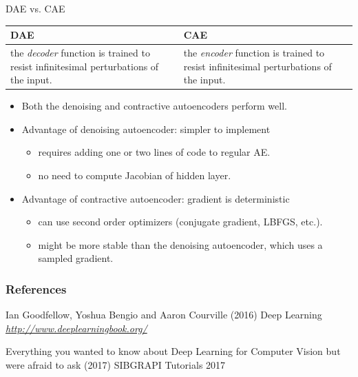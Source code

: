 \begin{frame}[t]{DAE vs. CAE}
    \begin{table}[h!]
        \centering
        \label{tab:}
        \begin{tabular}{p{5cm}|p{5cm}}
            \textbf{DAE} & \textbf{CAE}\\
            \hline
            the \textit{decoder} function is trained to resist infinitesimal perturbations of the input. & the \textit{encoder} function is trained to resist infinitesimal perturbations of the input.
        \end{tabular}
    \end{table}

\begin{itemize}
\item Both the denoising and contractive autoencoders perform well.
\item Advantage of denoising autoencoder: simpler to implement
\begin{itemize}
\item  requires adding one or two lines of code to regular AE.
\item  no need to compute Jacobian of hidden layer.
\end{itemize}
\item Advantage of contractive autoencoder: gradient is deterministic
\begin{itemize}
\item can use second order optimizers (conjugate gradient, LBFGS, etc.).
\item might be more stable than the denoising autoencoder, which uses a sampled gradient.
\end{itemize}

\end{itemize}

\end{frame}

\begin{vbframe}
\frametitle{References}
\footnotesize{
\begin{thebibliography}{99}
 Ian Goodfellow, Yoshua Bengio and Aaron Courville (2016)
\newblock Deep Learning
\newblock \emph{\url{http://www.deeplearningbook.org/}}

 Everything you wanted to know about Deep Learning for Computer Vision but were afraid to ask (2017)
\newblock SIBGRAPI Tutorials 2017

\end{thebibliography}
}
\end{vbframe}


\endlecture
